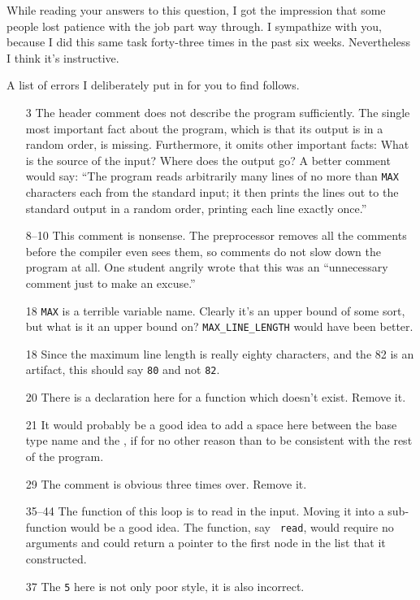 While reading your answers to this question, I got the impression that
some people lost patience with the job part way through.  I sympathize
with you, because I did this same task forty-three times in the past six
weeks.  Nevertheless I think it's instructive.

A list of errors I deliberately put in for you to find follows.

\begin{itemize}
\item[3] The header comment does not describe the program sufficiently.
The single most important fact about the program, which is that its
output is in a random order, is missing.  Furthermore, it omits other
important facts:  What is the source of the input?  Where does the
output go? A better comment would say:  ``The program reads arbitrarily
many lines of no more than {\tt MAX} characters each from the standard
input; it then prints the lines out to the standard output in a random
order, printing each line exactly once.''
\item[8--10] This comment is nonsense.  The preprocessor removes all the
comments before the compiler even sees them, so comments do not slow
down the program at all.  One student angrily wrote that this was an
``unnecessary comment just to make an excuse.''
\item[18] {\tt MAX} is a terrible variable name.  Clearly it's an upper bound
of some sort, but what is it an upper bound on?  {\tt MAX\_LINE\_LENGTH}
would have been better.  
\item[18] Since the maximum line length is really eighty characters, and
the 82 is an artifact, this should say {\tt 80} and not {\tt 82}.
\item[20] There is a declaration here for a function which doesn't
exist.  Remove it.
\item[21] It would probably be a good idea to add a space here between
the base type name and the {\tt *}, if for no other reason than to be
consistent with the rest of the program.
\item[29] The comment is obvious three times over.  Remove it.
\item[35--44] The function of this loop is to read in the input.  Moving
it into a sub-function would be a good idea.  The function, say {\tt
read}, would require no arguments and could return a pointer to the first
node in the list that it constructed. \label{read-input-function}
\item[37] The {\tt 5} here is not only poor style, it is also incorrect.

\end{itemize}
